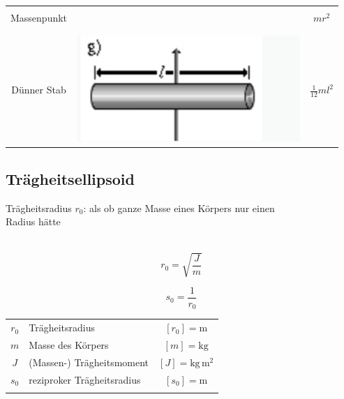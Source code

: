 \begin{tabular}{|c|c|c|}
				& & \\
				Massenpunkt & & $ m r^2 $\\
				& & \\
				& & \\ \hline
				& \multirow{5}{8em}{\includegraphics[width=\linewidth]{Bilder/Wellen-Optik/J_duenner_stab_mitte.png}} & \\
				& & \\
				Dünner Stab & & $ \frac{1}{12}ml^2 $\\
				& & \\
				& & \\ \hline
			\end{tabular}

	\subsection{Trägheitsellipsoid}
		Trägheitsradius $r_0$: als ob ganze Masse eines Körpers nur einen \\
		Radius hätte \\
		\\
		\begin{minipage}{0.48\linewidth}
			$$ \boxed{ r_0 = \sqrt{\frac{J}{m}}} $$
		\end{minipage}
		\hfill
		\begin{minipage}{0.48\linewidth}
			$$ \boxed{s_0 = \frac{1}{r_0} }$$
		\end{minipage}
		
		\begin{tabular}{c l c}
			$r_0$ & Trägheitsradius & $[r_0] = \mathrm{m}$ \\
			$m$ & Masse des Körpers & $[m] = \mathrm{kg}$ \\
			$J$ & (Massen-) Trägheitsmoment & $[J] = \mathrm{kg \, m^2}$ \\
			$s_0$ & reziproker Trägheitsradius & $[s_0] = \mathrm{m}$ \\
			\\
		\end{tabular}
		
